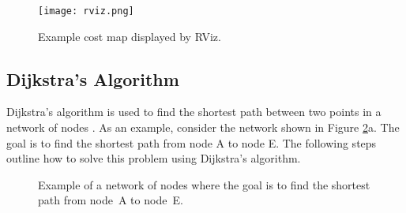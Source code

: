 \begin{figure}[!htb]
    \texttt{[image: rviz.png]}
    \centering
    \caption{Example cost map displayed by RViz.}
    \label{fig:rviz}
\end{figure}
\FloatBarrier

\subsection{Dijkstra's Algorithm} \label{dijkstra}
Dijkstra's algorithm is used to find the shortest path between two points in a network of nodes \parencite{computerphileDijkstraAlgorithmComputerphile2017}. As an example, consider the network shown in Figure \ref{fig:dijkstra}a. The goal is to find the shortest path from node A to node E. The following steps outline how to solve this problem using Dijkstra's algorithm.

\begin{figure}[!htb]
    \centering
    \qquad
    \caption{Example of a network of nodes where the goal is to find the shortest path from node A to node E.}
    \label{fig:dijkstra}
\end{figure}

\filbreak

